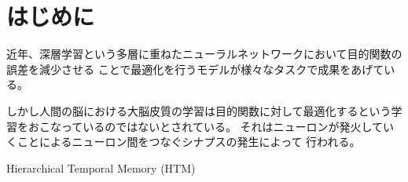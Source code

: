 \chapter{はじめに}
近年、深層学習という多層に重ねたニューラルネットワークにおいて目的関数の誤差を減少させる
ことで最適化を行うモデルが様々なタスクで成果をあげている。

しかし人間の脳における大脳皮質の学習は目的関数に対して最適化するという学習をおこなっているのではないとされている。
それはニューロンが発火していくことによるニューロン間をつなぐシナプスの発生によって
行われる。

Hierarchical Temporal Memory (HTM)
